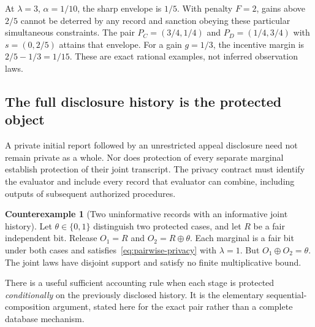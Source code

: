 \documentclass[11pt,letterpaper]{article}
\theoremstyle{plain}
\theoremstyle{definition}
\newtheorem{counterexample}[proposition]{Counterexample}
\theoremstyle{remark}
\begin{document}
At $\lambda=3$, $\alpha=1/10$, the sharp envelope is $1/5$. With penalty $F=2$, gains above $2/5$ cannot be deterred by any record and sanction obeying these particular simultaneous constraints. The pair $P_C=(3/4,1/4)$ and $P_D=(1/4,3/4)$ with $s=(0,2/5)$ attains that envelope. For a gain $g=1/3$, the incentive margin is $2/5-1/3=1/15$. These are exact rational examples, not inferred observation laws.

\subsection{The full disclosure history is the protected object}\label{sec:disclosure-history}

A private initial report followed by an unrestricted appeal disclosure need not remain private as a whole. Nor does protection of every separate marginal establish protection of their joint transcript. The privacy contract must identify the evaluator and include every record that evaluator can combine, including outputs of subsequent authorized procedures.

\begin{counterexample}[Two uninformative records with an informative joint history]\label{ex:privacy-marginals}
Let $\theta\in\{0,1\}$ distinguish two protected cases, and let $R$ be a fair independent bit. Release $O_1=R$ and $O_2=R\oplus\theta$. Each marginal is a fair bit under both cases and satisfies~\eqref{eq:pairwise-privacy} with $\lambda=1$. But $O_1\oplus O_2=\theta$. The joint laws have disjoint support and satisfy no finite multiplicative bound.
\end{counterexample}

There is a useful sufficient accounting rule when each stage is protected \emph{conditionally} on the previously disclosed history. It is the elementary sequential-composition argument, stated here for the exact pair rather than a complete database mechanism.
\end{document}
